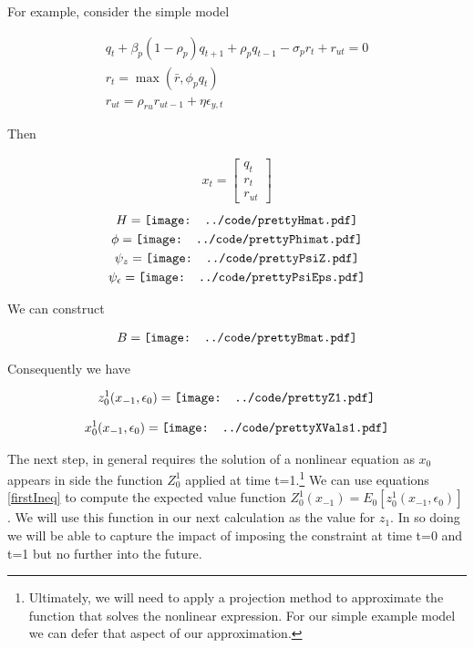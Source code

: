 \documentclass[12pt]{article}
\begin{document}
For example, consider the simple model


\begin{gather*}
q_{t} +\beta_p(1 - \rho_p)q_{t + 1} + \rho_pq_{t - 1} - \sigma_pr_{t} +
     r_{ut}=0\\
 r_{t} = \max (\bar{r}, \phi_pq_{t}) \\
 r_{ut} = \rho_{ru} r_{ut - 1} + \eta \epsilon_{y,t}
\end{gather*}

Then 

\begin{gather*}
  x_t=
  \begin{bmatrix}
    q_t\\r_{t}\\r_{ut}
  \end{bmatrix}
\end{gather*}
\begin{gather*}
  H= \vcenter{\hbox{\texttt{[image: ../code/prettyHmat.pdf]}}}\\
\phi=   \vcenter{\hbox{\texttt{[image: ../code/prettyPhimat.pdf]}}}\\
\psi_z=   \vcenter{\hbox{\texttt{[image: ../code/prettyPsiZ.pdf]}}}\\
\psi_\epsilon=   \vcenter{\hbox{\texttt{[image: ../code/prettyPsiEps.pdf]}}}\\
\end{gather*}

We can construct 

 \begin{gather*}
B=   \vcenter{\hbox{\texttt{[image: ../code/prettyBmat.pdf]}}}
 \end{gather*}

Consequently we have

 \begin{gather*}
z_0^1(x_{-1},\epsilon_0)=   \vcenter{\hbox{\texttt{[image: ../code/prettyZ1.pdf]}}}
 \end{gather*}


 \begin{gather*}
x_0^1(x_{-1},\epsilon_0)=   \vcenter{\hbox{\texttt{[image: ../code/prettyXVals1.pdf]}}}
 \end{gather*}




The next step, in general requires the solution of a nonlinear equation as $x_0$ appears in side the function $Z_0^1$ applied at time t=1.\footnote{Ultimately, we will  need to apply a projection method to approximate the function 
that solves the nonlinear expression.  For our simple example model we can defer that aspect of our approximation.}
We can use equations \ref{firstIneq} to compute the expected value function $Z_0^1(x_{-1})=E_{0}[z_0^1(x_{-1},\epsilon_0)]$.  We will use this function in 
our next calculation as the value for $z_{1}$.  In so doing we will be able to
capture the impact of imposing the constraint at time t=0 and t=1 but no further into the future.
\end{document}
